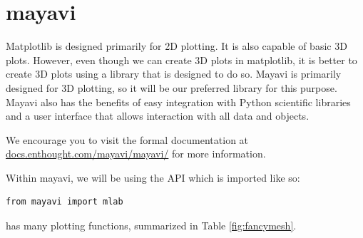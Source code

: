 \section*{mayavi}

Matplotlib is designed primarily for 2D plotting. It is also capable of basic 3D plots. However, even though we can create 3D plots in matplotlib, it is better to create 3D plots using a library that is designed to do so. Mayavi is primarily designed for 3D plotting, so it will be our preferred library for this purpose. Mayavi also has the benefits of easy integration with Python scientific libraries and a user interface that allows interaction with all data and objects.
 

We encourage you to visit the formal documentation at
\url{docs.enthought.com/mayavi/mayavi/} for more information. 

Within mayavi, we will be using the  API which is imported like so:
\begin{lstlisting}
from mayavi import mlab
\end{lstlisting}

 has many plotting functions, summarized in Table \ref{fig:fancymesh}.

